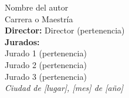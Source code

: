 \begin{titlepage}
\begin{flushright}
        {\fontsize{20pt}{25pt}\selectfont
        Nombre del autor} \\[1cm]

        {\fontsize{15pt}{20pt}\selectfont
        Carrera o Maestría} \\[2cm]

        {\fontsize{11pt}{15pt}\selectfont
        \textbf{Director:} Director (pertenencia)} \\[1cm]

        {\fontsize{11pt}{15pt}\selectfont
        \textbf{Jurados:}} \\[0.5cm]
        {\fontsize{11pt}{15pt}\selectfont
        Jurado 1 (pertenencia)} \\ 
        {\fontsize{11pt}{15pt}\selectfont
        Jurado 2 (pertenencia)} \\ 
        {\fontsize{11pt}{15pt}\selectfont
        Jurado 3 (pertenencia)} \\[2cm]

        {\itshape\fontsize{10pt}{12pt}\selectfont
        Ciudad de [lugar], [mes] de [año]} %
    \end{flushright}
\end{titlepage}
